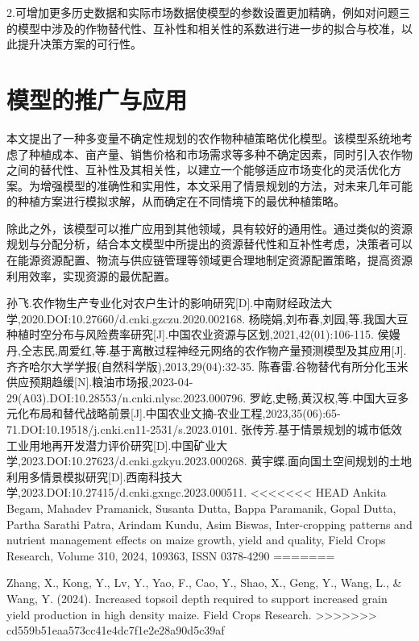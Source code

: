 \documentclass{cumcmthesis}
\begin{document}
2.可增加更多历史数据和实际市场数据使模型的参数设置更加精确，例如对问题三的模型中涉及的作物替代性、互补性和相关性的系数进行进一步的拟合与校准，以此提升决策方案的可行性。

\section{模型的推广与应用}
本文提出了一种多变量不确定性规划的农作物种植策略优化模型。该模型系统地考虑了种植成本、亩产量、销售价格和市场需求等多种不确定因素，同时引入农作物之间的替代性、互补性及其相关性，以建立一个能够适应市场变化的灵活优化方案。为增强模型的准确性和实用性，本文采用了情景规划的方法，对未来几年可能的种植方案进行模拟求解，从而确定在不同情境下的最优种植策略。

除此之外，该模型可以推广应用到其他领域，具有较好的通用性。通过类似的资源规划与分配分析，结合本文模型中所提出的资源替代性和互补性考虑，决策者可以在能源资源配置、物流与供应链管理等领域更合理地制定资源配置策略，提高资源利用效率，实现资源的最优配置。

\begin{thebibliography}{99}  
 孙飞.农作物生产专业化对农户生计的影响研究[D].中南财经政法大学,2020.DOI:10.27660/d.cnki.gzczu.2020.002168.
 杨晓娟,刘布春,刘园,等.我国大豆种植时空分布与风险费率研究[J].中国农业资源与区划,2021,42(01):106-115.
 侯嫚丹,仝志民,周爱红,等.基于离散过程神经元网络的农作物产量预测模型及其应用[J].齐齐哈尔大学学报(自然科学版),2013,29(04):32-35.
 陈春雷.谷物替代有所分化玉米供应预期趋缓[N].粮油市场报,2023-04-29(A03).DOI:10.28553/n.cnki.nlysc.2023.000796.
 罗屹,史畅,黄汉权,等.中国大豆多元化布局和替代战略前景[J].中国农业文摘-农业工程,2023,35(06):65-71.DOI:10.19518/j.cnki.cn11-2531/s.2023.0101.
 张传芳.基于情景规划的城市低效工业用地再开发潜力评价研究[D].中国矿业大学,2023.DOI:10.27623/d.cnki.gzkyu.2023.000268.
 黄宇蝶.面向国土空间规划的土地利用多情景模拟研究[D].西南科技大学,2023.DOI:10.27415/d.cnki.gxngc.2023.000511.
<<<<<<< HEAD
 Ankita Begam, Mahadev Pramanick, Susanta Dutta, Bappa Paramanik, Gopal Dutta, Partha Sarathi Patra, Arindam Kundu, Asim Biswas, Inter-cropping patterns and nutrient management effects on maize growth, yield and quality,
Field Crops Research, Volume 310, 2024, 109363, ISSN 0378-4290
=======


 Zhang, X., Kong, Y., Lv, Y., Yao, F., Cao, Y., Shao, X., Geng, Y., Wang, L., \& Wang, Y. (2024). Increased topsoil depth required to support increased grain yield production in high density maize. Field Crops Research.
>>>>>>> cd559b51eaa573cc41e4dc7f1e2e28a90d5c39af



\end{thebibliography}
\end{document}
